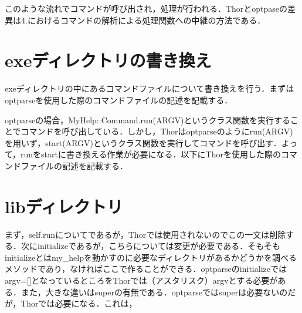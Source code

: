 このような流れでコマンドが呼び出され，処理が行われる．Thorとoptpaseの差異は4.におけるコマンドの解析による処理関数への中継の方法である．

\section{exeディレクトリの書き換え}\label{exeux30c7ux30a3ux30ecux30afux30c8ux30eaux306eux66f8ux304dux63dbux3048}

exeディレクトリの中にあるコマンドファイルについて書き換えを行う．まずはoptparseを使用した際のコマンドファイルの記述を記載する．

\begin{Shaded}
\begin{Highlighting}[]

\NormalTok{::}\NormalTok{)}
\end{Highlighting}
\end{Shaded}

optparseの場合，MyHelp::Command.run(ARGV)というクラス関数を実行することでコマンドを呼び出している．しかし，Thorはoptparseのようにrun(ARGV)を用いず，start(ARGV)というクラス関数を実行してコマンドを呼び出す．よって，runをstartに書き換える作業が必要になる．以下にThorを使用した際のコマンドファイルの記述を記載する．

\begin{Shaded}
\begin{Highlighting}[]

\NormalTok{::}\NormalTok{)}
\end{Highlighting}
\end{Shaded}

\section{libディレクトリ}\label{libux30c7ux30a3ux30ecux30afux30c8ux30ea}

まず，self.runについてであるが，Thorでは使用されないのでこの一文は削除する．次にinitializeであるが，こちらについては変更が必要である．そもそもinitializeとはmy\_helpを動かすのに必要なディレクトリがあるかどうかを調べるメソッドであり，なければここで作ることができる．optparseのinitializeではargv={[}{]}となっているところをThorでは（アスタリスク）argvとする必要がある．また，大きな違いはsuperの有無である．optparseではsuperは必要ないのだが，Thorでは必要になる．これは，

